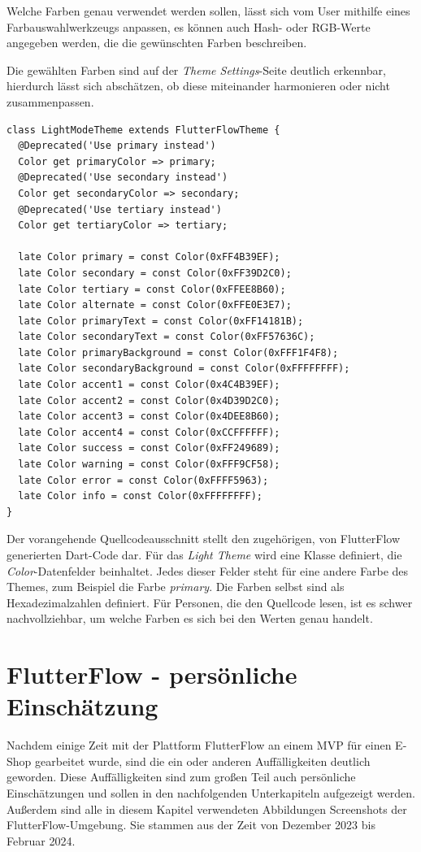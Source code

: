 \documentclass[acmtog, language=ngerman]{acmart}
\begin{document}
Welche Farben genau verwendet werden sollen, lässt sich vom User mithilfe eines Farbauswahlwerkzeugs anpassen, es können auch Hash- oder RGB-Werte angegeben werden, die die gewünschten Farben beschreiben. 

Die gewählten Farben sind auf der \textit{Theme Settings}-Seite deutlich erkennbar, hierdurch lässt sich abschätzen, ob diese miteinander harmonieren oder nicht zusammenpassen.

\begin{verbatim}
class LightModeTheme extends FlutterFlowTheme {
  @Deprecated('Use primary instead')
  Color get primaryColor => primary;
  @Deprecated('Use secondary instead')
  Color get secondaryColor => secondary;
  @Deprecated('Use tertiary instead')
  Color get tertiaryColor => tertiary;

  late Color primary = const Color(0xFF4B39EF);
  late Color secondary = const Color(0xFF39D2C0);
  late Color tertiary = const Color(0xFFEE8B60);
  late Color alternate = const Color(0xFFE0E3E7);
  late Color primaryText = const Color(0xFF14181B);
  late Color secondaryText = const Color(0xFF57636C);
  late Color primaryBackground = const Color(0xFFF1F4F8);
  late Color secondaryBackground = const Color(0xFFFFFFFF);
  late Color accent1 = const Color(0x4C4B39EF);
  late Color accent2 = const Color(0x4D39D2C0);
  late Color accent3 = const Color(0x4DEE8B60);
  late Color accent4 = const Color(0xCCFFFFFF);
  late Color success = const Color(0xFF249689);
  late Color warning = const Color(0xFFF9CF58);
  late Color error = const Color(0xFFFF5963);
  late Color info = const Color(0xFFFFFFFF);
}
\end{verbatim}

Der vorangehende Quellcodeausschnitt stellt den zugehörigen, von FlutterFlow generierten Dart-Code dar. Für das \textit{Light Theme} wird eine Klasse definiert, die \textit{Color}-Datenfelder beinhaltet. Jedes dieser Felder steht für eine andere Farbe des Themes, zum Beispiel die Farbe \textit{primary}. Die Farben selbst sind als Hexadezimalzahlen definiert. Für Personen, die den Quellcode lesen, ist es schwer nachvollziehbar, um welche Farben es sich bei den Werten genau handelt.

\section{FlutterFlow - persönliche Einschätzung}

Nachdem einige Zeit mit der Plattform FlutterFlow an einem MVP für einen E-Shop gearbeitet wurde, sind die ein oder anderen Auffälligkeiten deutlich geworden. Diese Auffälligkeiten sind zum großen Teil auch persönliche Einschätzungen und sollen in den nachfolgenden Unterkapiteln aufgezeigt werden.
Außerdem sind alle in diesem Kapitel verwendeten Abbildungen Screenshots der FlutterFlow-Umgebung. Sie stammen aus der Zeit von Dezember 2023 bis Februar 2024.
\end{document}
